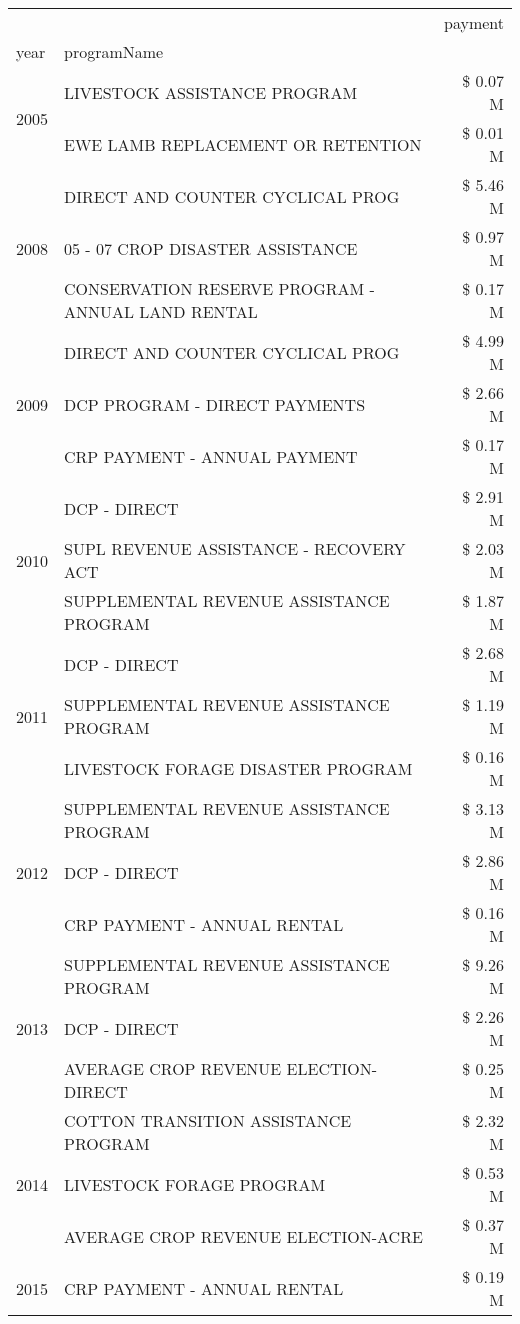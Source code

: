\begin{tabular}{llr}
\toprule
 &  & payment \\
year & programName &  \\
\midrule
\multirow[t]{2}{*}{2005} & LIVESTOCK ASSISTANCE PROGRAM & \$ 0.07 M \\
 & EWE LAMB REPLACEMENT OR RETENTION & \$ 0.01 M \\
\cline{1-3}
\multirow[t]{3}{*}{2008} & DIRECT AND COUNTER CYCLICAL PROG & \$ 5.46 M \\
 & 05 - 07 CROP DISASTER ASSISTANCE & \$ 0.97 M \\
 & CONSERVATION RESERVE PROGRAM - ANNUAL LAND RENTAL & \$ 0.17 M \\
\cline{1-3}
\multirow[t]{3}{*}{2009} & DIRECT AND COUNTER CYCLICAL PROG & \$ 4.99 M \\
 & DCP PROGRAM - DIRECT PAYMENTS & \$ 2.66 M \\
 & CRP PAYMENT - ANNUAL PAYMENT & \$ 0.17 M \\
\cline{1-3}
\multirow[t]{3}{*}{2010} & DCP - DIRECT & \$ 2.91 M \\
 & SUPL REVENUE ASSISTANCE - RECOVERY ACT & \$ 2.03 M \\
 & SUPPLEMENTAL REVENUE ASSISTANCE PROGRAM & \$ 1.87 M \\
\cline{1-3}
\multirow[t]{3}{*}{2011} & DCP - DIRECT & \$ 2.68 M \\
 & SUPPLEMENTAL REVENUE ASSISTANCE PROGRAM & \$ 1.19 M \\
 & LIVESTOCK FORAGE DISASTER PROGRAM & \$ 0.16 M \\
\cline{1-3}
\multirow[t]{3}{*}{2012} & SUPPLEMENTAL REVENUE ASSISTANCE PROGRAM & \$ 3.13 M \\
 & DCP - DIRECT & \$ 2.86 M \\
 & CRP PAYMENT - ANNUAL RENTAL & \$ 0.16 M \\
\cline{1-3}
\multirow[t]{3}{*}{2013} & SUPPLEMENTAL REVENUE ASSISTANCE PROGRAM & \$ 9.26 M \\
 & DCP - DIRECT & \$ 2.26 M \\
 & AVERAGE CROP REVENUE ELECTION-DIRECT & \$ 0.25 M \\
\cline{1-3}
\multirow[t]{3}{*}{2014} & COTTON TRANSITION ASSISTANCE PROGRAM & \$ 2.32 M \\
 & LIVESTOCK FORAGE PROGRAM & \$ 0.53 M \\
 & AVERAGE CROP REVENUE ELECTION-ACRE & \$ 0.37 M \\
\cline{1-3}
\multirow[t]{3}{*}{2015} & CRP PAYMENT - ANNUAL RENTAL & \$ 0.19 M \\

\end{tabular}

